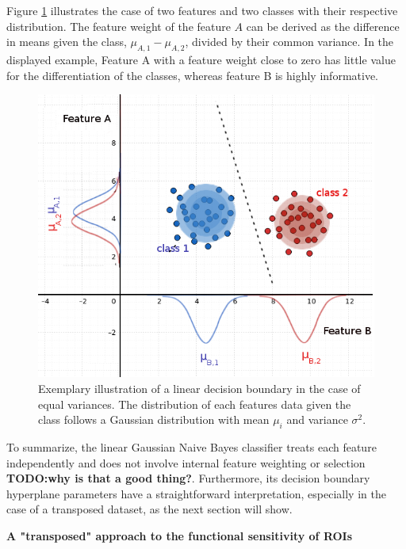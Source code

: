 \documentclass[a4paper, 12pt]{scrreprt}
\begin{document}
Figure \ref{GNB} illustrates the case of two features and two classes with their respective distribution. The feature weight of the feature $A$ can be derived as the difference in means given the class, $\mu_{A, 1} - \mu_{A, 2}$, divided by their common variance. In the displayed example, Feature A with a feature weight close to zero has little value for the differentiation of the classes, whereas feature B is highly informative. \newline

\begin{figure}[H]
	\includegraphics[scale=0.5]{img/improved_GNB.png}
	\caption[A linear decision boundery for a linear Gaussian Naive Bayes classifier]{\small{Exemplary illustration of a linear decision boundary in the case of equal variances. The distribution of each features data given the class follows a Gaussian distribution with mean $\mu_i$ and variance $\sigma^2$.}}
	\label{GNB}
\end{figure}

To summarize, the linear Gaussian Naive Bayes classifier treats each feature independently and does not involve internal feature weighting or selection  \textbf{TODO:why is that a good thing?}. Furthermore, its decision boundary hyperplane parameters have a straightforward interpretation, especially in the case of a transposed dataset, as the next section will show.
\bigskip


\noindent \textbf{A "transposed" approach to the functional sensitivity of ROIs}\hfill
\medskip
\end{document}

